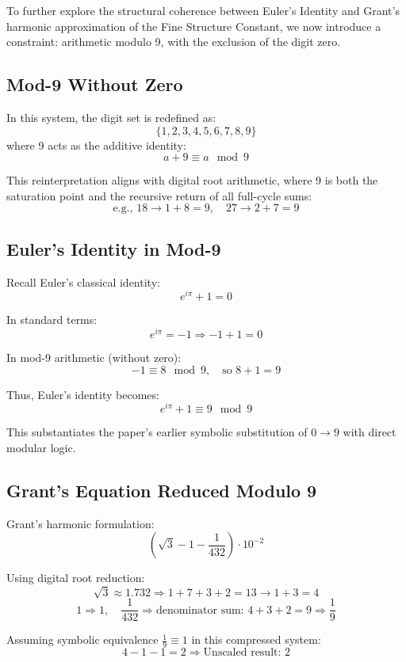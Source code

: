 \documentclass[12pt]{article}
\begin{document}
To further explore the structural coherence between Euler’s Identity and Grant’s harmonic approximation of the Fine Structure Constant, we now introduce a constraint: arithmetic modulo 9, with the exclusion of the digit zero.

\subsection*{Mod-9 Without Zero}

In this system, the digit set is redefined as:
\[
\{1, 2, 3, 4, 5, 6, 7, 8, 9\}
\]
where 9 acts as the additive identity:
\[
a + 9 \equiv a \mod 9
\]

This reinterpretation aligns with digital root arithmetic, where 9 is both the saturation point and the recursive return of all full-cycle sums:
\[
\text{e.g., } 18 \rightarrow 1 + 8 = 9,\quad 27 \rightarrow 2 + 7 = 9
\]

\subsection*{Euler’s Identity in Mod-9}

Recall Euler’s classical identity:
\[
e^{i\pi} + 1 = 0
\]

In standard terms:
\[
e^{i\pi} = -1 \Rightarrow -1 + 1 = 0
\]

In mod-9 arithmetic (without zero):
\[
-1 \equiv 8 \mod 9,\quad \text{so } 8 + 1 = 9
\]

Thus, Euler’s identity becomes:
\[
e^{i\pi} + 1 \equiv 9 \mod 9
\]

This substantiates the paper’s earlier symbolic substitution of \(0 \rightarrow 9\) with direct modular logic.

\subsection*{Grant’s Equation Reduced Modulo 9}

Grant’s harmonic formulation:
\[
\left( \sqrt{3} - 1 - \frac{1}{432} \right) \cdot 10^{-2}
\]

Using digital root reduction:
\[
\sqrt{3} \approx 1.732 \Rightarrow 1 + 7 + 3 + 2 = 13 \rightarrow 1 + 3 = 4
\]
\[
1 \Rightarrow 1,\quad \frac{1}{432} \Rightarrow \text{denominator sum: } 4 + 3 + 2 = 9
\Rightarrow \frac{1}{9}
\]

Assuming symbolic equivalence \( \frac{1}{9} \equiv 1 \) in this compressed system:
\[
4 - 1 - 1 = 2
\Rightarrow \text{Unscaled result: } 2
\]
\end{document}
